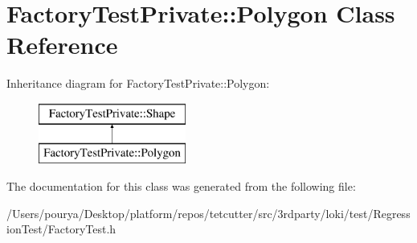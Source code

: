 \hypertarget{classFactoryTestPrivate_1_1Polygon}{}\section{Factory\+Test\+Private\+:\+:Polygon Class Reference}
\label{classFactoryTestPrivate_1_1Polygon}
Inheritance diagram for Factory\+Test\+Private\+:\+:Polygon\+:\begin{figure}[H]
\begin{center}
\leavevmode
\includegraphics[height=2.000000cm]{classFactoryTestPrivate_1_1Polygon}
\end{center}
\end{figure}


The documentation for this class was generated from the following file\+:\begin{DoxyCompactItemize}
\item 
/\+Users/pourya/\+Desktop/platform/repos/tetcutter/src/3rdparty/loki/test/\+Regression\+Test/Factory\+Test.\+h\end{DoxyCompactItemize}
